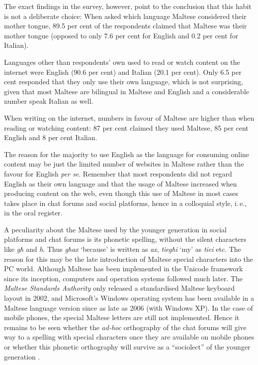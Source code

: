 \documentclass[]{../../metanetpaper}
\begin{document}
\begin{multicols}{2}
The exact findings in the survey, however, point to the conclusion that this habit is not a deliberate choice: When asked which language Maltese considered their mother tongue, 89.5 per cent of the respondents claimed that Maltese was their mother tongue (opposed to only 7.6 per cent for English and 0.2 per cent for Italian). 

Languages other than respondents' own used to read or watch content on the internet were English (90.6 per cent) and Italian (20.1 per cent). Only 6.5 per cent responded that they only use their own language, which is not surprising, given that most Maltese are bilingual in Maltese and English and a considerable number speak Italian as well.

When writing on the internet, numbers in favour of Maltese are higher than when reading or watching content: 87 per cent claimed they used Maltese, 85 per cent English and 8 per cent Italian. 

The reason for the majority to use English as the language for consuming online content may be just the limited number of websites in Maltese rather than the favour for English \emph{per se}. Remember that most respondents did not regard English as their own language and that the usage of Maltese increased when producing content on the web, even though this use of Maltese in most cases takes place in chat forums and social platforms, hence in a colloquial style, i.\,e., in the oral register. 

A peculiarity about the Maltese used by the younger generation in social platforms and chat forums is its phonetic spelling, without the silent characters like \emph{għ} and \emph{h}. Thus \emph{għax} `because' is written as \emph{ax}, \emph{tiegħi} `my' as \emph{tiei} etc. The reason for this may be the late introduction of Maltese special characters into the PC world. Although Maltese has been implemented in the Unicode framework since its inception, computers and operation systems followed much later. The \emph{Maltese Standards Authority} only released a standardised Maltese keyboard layout in 2002, and Microsoft's Windows operating system has been available in a Maltese language version since as late as 2006 (with Windows XP). In the case of mobile phones, the special Maltese letters are still not implemented. Hence it remains to be seen whether the \emph{ad-hoc} orthography of the chat forums will give way to a spelling with special characters once they are available on mobile phones or whether this phonetic orthography will survive as a ``sociolect'' of the younger generation \cite{Fabri:2011b}.


\end{multicols}
\end{document}
